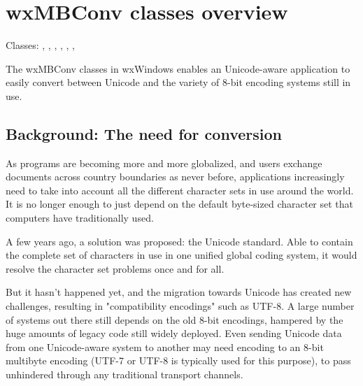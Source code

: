 
\section{wxMBConv classes overview}\label{mbconvclasses}

Classes: , , 
, , 
,
, 

The wxMBConv classes in wxWindows enables an Unicode-aware application to
easily convert between Unicode and the variety of 8-bit encoding systems still
in use.

\subsection{Background: The need for conversion}

As programs are becoming more and more globalized, and users exchange documents
across country boundaries as never before, applications increasingly need to
take into account all the different character sets in use around the world. It
is no longer enough to just depend on the default byte-sized character set that
computers have traditionally used.

A few years ago, a solution was proposed: the Unicode standard. Able to contain
the complete set of characters in use in one unified global coding system,
it would resolve the character set problems once and for all.

But it hasn't happened yet, and the migration towards Unicode has created new
challenges, resulting in "compatibility encodings" such as UTF-8. A large
number of systems out there still depends on the old 8-bit encodings, hampered
by the huge amounts of legacy code still widely deployed. Even sending
Unicode data from one Unicode-aware system to another may need encoding to an
8-bit multibyte encoding (UTF-7 or UTF-8 is typically used for this purpose), to
pass unhindered through any traditional transport channels.


